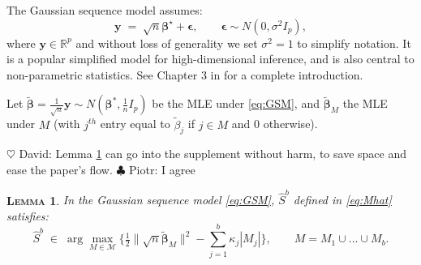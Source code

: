 \documentclass[aos]{imsart}
\theoremstyle{plain}
\newtheorem{lem}{\textsc{Lemma}}[section]
\newcommand{\david}[1]{{\small{\color{blue} \sf $\heartsuit$ David: #1}}}
\newcommand{\piotr}[1]{{\small{\color{red} \sf $\clubsuit$ Piotr: #1}}}
\newcommand{\M}{\mathcal{M}}
\newcommand{\bs}{\boldsymbol}
\begin{document}
The Gaussian sequence model assumes:
\begin{equation}\label{eq:GSM}
	\bs y \;=\; \sqrt{n} \bs \beta^{\star} + \bs\epsilon,\qquad \bs \epsilon \sim N(0,\sigma^2 I_p),
\end{equation}
where $\bs y \in \mathbb{R}^p$ and without loss of generality we set $\sigma^2=1$ to simplify notation. It is a popular simplified model for high-dimensional inference, and is also central to non-parametric statistics. See Chapter 3 in \cite{johnstone} for a complete introduction. 

Let $\tilde{\bs \beta}=\frac{1}{\sqrt{n}}\bs y \sim N(\bs \beta^*,\tfrac{1}{n}I_p)$ be the MLE under \eqref{eq:GSM}, and $\tilde{\bs \beta}_M$ the MLE under $M$ (with $j^{th}$ entry equal to $\tilde{\beta}_j$ if $j \in M$ and 0 otherwise).

\david{Lemma \ref{lem:useful-reformulation-GSM} can go into the supplement without harm, to save space and ease the paper's flow.}\piotr{I agree}
\begin{lem}\label{lem:useful-reformulation-GSM}
In the Gaussian sequence model \eqref{eq:GSM}, $\hat{S}^b$ defined in \eqref{eq:Mhat} satisfies:
    \begin{equation}\label{eq:MhatGSM}
  \hat S^b\;\in\;\arg\max_{M\in \M} \bigg\{\tfrac{1}{2}\| \sqrt{n}\tilde{\bs \beta}_M\|^2-\sum_{j=1}^b\kappa_j |M_j|\bigg\}, \qquad M=M_1\cup \ldots\cup M_b.	
\end{equation}
\end{lem}
\end{document}
